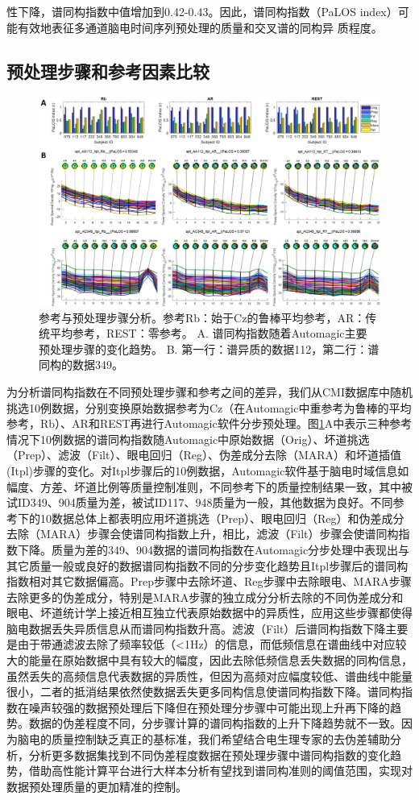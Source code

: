 性下降，谱同构指数中值增加到0.42-0.43。因此，谱同构指数（PaLOS index）可能有效地表征多通道脑电时间序列预处理的质量和交叉谱的同构异
质程度。

\subsection{预处理步骤和参考因素比较}
\begin{figure}[!h]
	\includegraphics[width=15cm]{pic/palos/step.png}
	\caption{参考与预处理步骤分析。参考Rb：始于Cz的鲁棒平均参考，AR：传统平均参考，REST：零参考。 A. 谱同构指数随着Automagic主要
	预处理步骤的变化趋势。 B. 第一行：谱异质的数据112，第二行：谱同构的数据349。}
	\label{step}
\end{figure}
为分析谱同构指数在不同预处理步骤和参考之间的差异，我们从CMI数据库中随机挑选10例数据，分别变换原始数据参考为Cz（在Automagic中重参考为鲁棒的平均参考，Rb）、AR和REST再进行Automagic软件分步预处理。图\ref{step}A中表示三种参考情况下10例数据的谱同构指数随Automagic中原始数据（Orig）、坏道挑选（Prep）、滤波（Filt）、眼电回归（Reg）、伪差成分去除（MARA）和坏道插值(Itpl)步骤的变化。对Itpl步骤后的10例数据，Automagic软件基于脑电时域信息如幅度、方差、坏道比例等质量控制准则，不同参考下的质量控制结果一致，其中被试ID349、904质量为差，被试ID117、948质量为一般，其他数据为良好。不同参考下的10数据总体上都表明应用坏道挑选（Prep）、眼电回归（Reg）和伪差成分去除（MARA）步骤会使谱同构指数上升，相比，滤波（Filt）步骤会使谱同构指数下降。质量为差的349、904数据的谱同构指数在Automagic分步处理中表现出与其它质量一般或良好的数据谱同构指数不同的分步变化趋势且Itpl步骤后的谱同构指数相对其它数据偏高。Prep步骤中去除坏道、Reg步骤中去除眼电、MARA步骤去除更多的伪差成分，特别是MARA步骤的独立成分分析去除的不同伪差成分和眼电、坏道统计学上接近相互独立代表原始数据中的异质性，应用这些步骤都使得脑电数据丢失异质信息从而谱同构指数升高。滤波（Filt）后谱同构指数下降主要是由于带通滤波去除了频率较低（<1Hz）的信息，而低频信息在谱曲线中对应较大的能量在原始数据中具有较大的幅度，因此去除低频信息丢失数据的同构信息，虽然丢失的高频信息代表数据的异质性，但因为高频对应幅度较低、谱曲线中能量很小，二者的抵消结果依然使数据丢失更多同构信息使谱同构指数下降。谱同构指数在噪声较强的数据预处理后下降但在预处理分步骤中可能出现上升再下降的趋势。数据的伪差程度不同，分步骤计算的谱同构指数的上升下降趋势就不一致。因为脑电的质量控制缺乏真正的基标准，我们希望结合电生理专家的去伪差辅助分析，分析更多数据集找到不同伪差程度数据在预处理步骤中谱同构指数的变化趋势，借助高性能计算平台进行大样本分析有望找到谱同构准则的阈值范围，实现对数据预处理质量的更加精准的控制。

